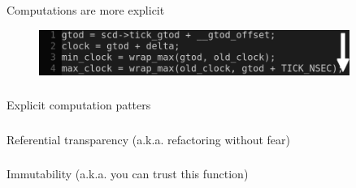 \documentclass[usenames,dvipsnames, 18pt, compress, aspectratio=169]{beamer}
\begin{document}



\begin{frame}
    \frametitle{}
    \begin{center}
    Computations are more explicit
    \begin{figure}
        \includegraphics[width=0.9\textwidth,center]{instructions_order.png}
    \end{figure}
    \end{center}
\end{frame}

\begin{frame}
    \frametitle{}
    \begin{center}
    Explicit computation patters
    \end{center}
\end{frame}

\begin{frame}
    \frametitle{}
    \begin{center}
    Referential transparency (a.k.a. refactoring without fear)
    \end{center}
\end{frame}

\begin{frame}
    \frametitle{}
    \begin{center}
    Immutability (a.k.a. you can trust this function)
    \end{center}
\end{frame}
\end{document}
